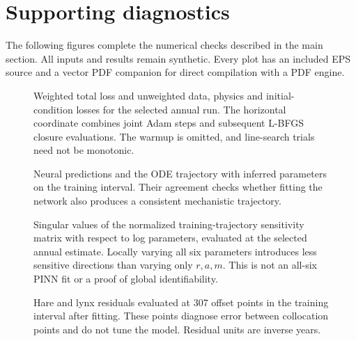 \section{Supporting diagnostics}
The following figures complete the numerical checks described in the main section.
All inputs and results remain synthetic. Every plot has an included EPS source and
a vector PDF companion for direct compilation with a PDF engine.

\begin{figure}[htbp]\centering
{}
\caption{Weighted total loss and unweighted data, physics and initial-condition
losses for the selected annual run. The horizontal coordinate combines joint Adam
steps and subsequent L-BFGS closure evaluations. The warmup is omitted, and line-search
trials need not be monotonic.}
\label{fig:yash-losses}
\end{figure}

\begin{figure}[htbp]\centering
{}
\caption{Neural predictions and the ODE trajectory with inferred parameters on
the training interval. Their agreement checks whether fitting the network also
produces a consistent mechanistic trajectory.}
\label{fig:yash-consistency}
\end{figure}

\begin{figure}[htbp]\centering
{}
\caption{Singular values of the normalized training-trajectory sensitivity matrix
with respect to log parameters, evaluated at the selected annual estimate. Locally
varying all six parameters introduces less sensitive directions than varying only
$r,a,m$. This is not an all-six PINN fit or a proof of global identifiability.}
\label{fig:yash-identifiability}
\end{figure}

\begin{figure}[htbp]\centering
{}
\caption{Hare and lynx residuals evaluated at 307 offset points in the training
interval after fitting. These points diagnose error between collocation points and
do not tune the model. Residual units are inverse years.}
\label{fig:yash-residuals}
\end{figure}
